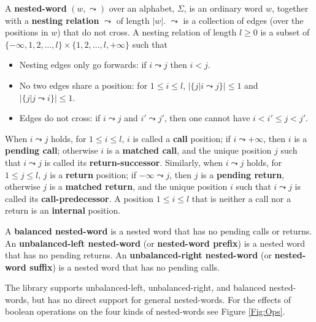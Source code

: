 \documentclass{llncs}
\begin{document}
\begin{definition}
\label{De:nested word}
A \textbf{nested-word} $(w,\leadsto)$ over an alphabet, $\Sigma$, is an ordinary word $w$, together with a \textbf{nesting relation} $\leadsto$ of length $|w|$.  $\leadsto$ is a collection of edges (over the positions in $w$) that do not cross.  A nesting relation of length $l \geq 0$ is a subset of $\{-\infty,1,2,\ldots,l\} \times \{1,2,\ldots,l,+\infty\}$ such that 
\begin{itemize}
	\item
	 Nesting edges only go forwards: if $i \leadsto j$ then $i < j$.

	 \item
	  No two edges share a position: for $1 \leq i \leq l$, $|\{j | i \leadsto j \}| \leq 1$ and $|\{ j | j \leadsto i \}| \leq 1$.

	  \item
	  Edges do not cross: if $i \leadsto j$ and $i' \leadsto j'$, then one cannot have $i < i' \leq j < j'$.

\end{itemize}
When $i \leadsto j$ holds, for $1 \leq i \leq l$, $i$ is called a \textbf{call} position; if $i \leadsto +\infty$, then $i$ is a \textbf{pending call}; otherwise $i$ is a \textbf{matched call}, and the unique position $j$ such that $i \leadsto j$ is called its \textbf{return-successor}.  Similarly, when $i \leadsto j$ holds, for $1 \leq j \leq l$, $j$ is a \textbf{return} position; if $-\infty \leadsto j$, then $j$ is a \textbf{pending return}, otherwise $j$ is a \textbf{matched return}, and the unique position $i$ such that $i \leadsto j$ is called its \textbf{call-predecessor}.  A position $1 \leq i \leq l$ that is neither a call nor a return is an \textbf{internal} position.

A \textbf{balanced nested-word} is a nested word that has no pending calls or returns.  An \textbf{unbalanced-left nested-word} (or \textbf{nested-word prefix}) is a nested word that has no pending returns.  An \textbf{unbalanced-right nested-word} (or \textbf{nested-word suffix}) is a nested word that has no pending calls.
\end{definition}

The library supports unbalanced-left, unbalanced-right, and balanced nested-words, but has no direct support for general nested-words.  For the effects of boolean operations on the four kinds of nested-words see Figure \ref{Fig:Ops}.
\end{document}
